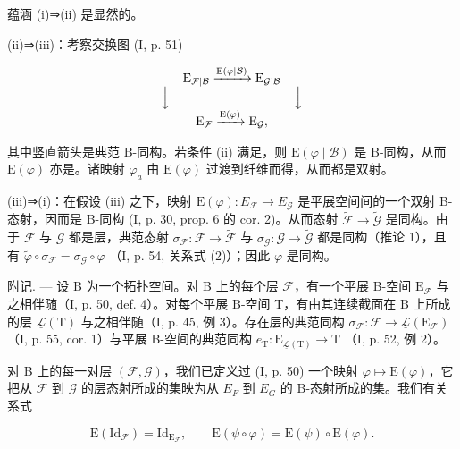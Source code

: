 蕴涵 (i)⇒(ii) 是显然的。

(ii)⇒(iii)：考察交换图 (I, p. 51)

\[
\begin{array}{c} \mathrm{E} _ {\mathcal {F} | \mathcal {B}} \xrightarrow {\mathrm{E} (\varphi | \mathcal {B})} \mathrm{E} _ {\mathcal {G} | \mathcal {B}} \\ \Big \downarrow \qquad \qquad \qquad \qquad \qquad \Big \downarrow \\ \mathrm{E} _ {\mathcal {F}} \xrightarrow {\mathrm{E} (\varphi)} \mathrm{E} _ {\mathcal {G}}, \end{array}
\]

其中竖直箭头是典范 B-同构。若条件 (ii) 满足，则 \(\mathrm{E}(\varphi \mid \mathcal{B})\) 是 B-同构，从而 \(\mathrm{E}(\varphi)\) 亦是。诸映射 \(\varphi_{a}\) 由 \(\mathrm{E}(\varphi)\) 过渡到纤维而得，从而都是双射。

(iii)⇒(i)：在假设 (iii) 之下，映射 \(\mathrm{E}(\varphi)\colon E_{\mathcal{F}} \to E_{\mathcal{G}}\) 是平展空间间的一个双射 B-态射，因而是 B-同构 (I, p. 30, prop. 6 的 cor. 2)。从而态射 \(\widetilde{\mathcal{F}}\to\widetilde{\mathcal{G}}\) 是同构。由于 \(\mathcal{F}\) 与 \(\mathcal{G}\) 都是层，典范态射 \(\sigma_{\mathcal{F}}\colon\mathcal{F}\to\widetilde{\mathcal{F}}\) 与 \(\sigma_{\mathcal{G}}\colon\mathcal{G}\to\widetilde{\mathcal{G}}\) 都是同构（推论 1），且有 \(\widetilde{\varphi}\circ\sigma_{\mathcal{F}}=\sigma_{\mathcal{G}}\circ\varphi\) （I, p. 54, 关系式 (2)）；因此 \(\varphi\) 是同构。

附记. --- 设 B 为一个拓扑空间。对 B 上的每个层 \(\mathcal{F}\)，有一个平展 B-空间 \(\mathrm{E}_{\mathcal{F}}\) 与之相伴随（I, p. 50, def. 4）。对每个平展 B-空间 T，有由其连续截面在 B 上所成的层 \(\underline{\mathcal{L}}(\mathrm{T})\) 与之相伴随（I, p. 45, 例 3）。存在层的典范同构 \(\sigma_{\mathcal{F}}\colon \mathcal{F}\to \underline{\mathcal{L}}(\mathrm{E}_{\mathcal{F}})\) （I, p. 55, cor. 1）与平展 B-空间的典范同构 \(e_{\mathrm{T}}\colon \mathrm{E}_{\underline{\mathcal{L}}(\mathrm{T})}\to \mathrm{T}\) （I, p. 52, 例 2）。

对 B 上的每一对层 \((\mathcal{F},\mathcal{G})\)，我们已定义过 (I, p. 50) 一个映射 \(\varphi\mapsto\mathrm{E}(\varphi)\)，它把从 \(\mathcal{F}\) 到 \(\mathcal{G}\) 的层态射所成的集映为从 \(E_{F}\) 到 \(E_{G}\) 的 B-态射所成的集。我们有关系式

\[
\mathrm{E} (\mathrm{Id} _ {\mathcal {F}}) = \mathrm{Id} _ {\mathrm{E} _ {\mathcal {F}}}, \qquad \mathrm{E} (\psi \circ \varphi) = \mathrm{E} (\psi) \circ \mathrm{E} (\varphi).
\]

